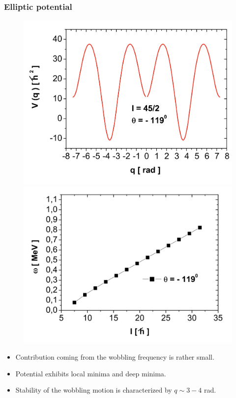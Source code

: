 \documentclass{beamer}
\begin{document}
\begin{frame}
  \frametitle{Elliptic potential}
\begin{figure}
  \includegraphics[scale=0.2]{figures/potential-pr-135.png}
  \includegraphics[scale=0.04]{figures/frequencies-pr-135.png}
\end{figure}
\begin{itemize}
  \item Contribution coming from the wobbling frequency is rather small.
  \item Potential exhibits local minima and deep minima.
  \item Stability of the wobbling motion is characterized by $q\sim3-4$ rad.
\end{itemize}
\end{frame}
\end{document}

